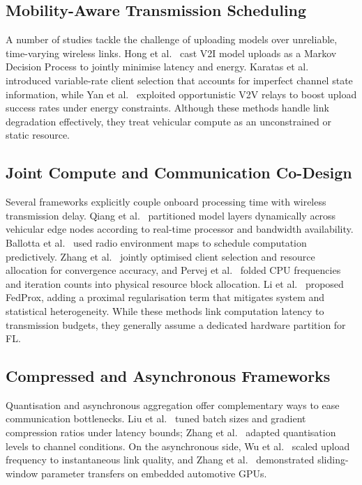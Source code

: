 \documentclass[conference]{IEEEtran}
\begin{document}
\subsection{Mobility-Aware Transmission Scheduling}
A number of studies tackle the challenge of uploading models over unreliable, time-varying wireless links. Hong et al.~\cite{ref_hong} cast V2I model uploads as a Markov Decision Process to jointly minimise latency and energy. Karatas et al.~\cite{ref_karatas} introduced variable-rate client selection that accounts for imperfect channel state information, while Yan et al.~\cite{ref_yan} exploited opportunistic V2V relays to boost upload success rates under energy constraints. Although these methods handle link degradation effectively, they treat vehicular compute as an unconstrained or static resource.

\subsection{Joint Compute and Communication Co-Design}
Several frameworks explicitly couple onboard processing time with wireless transmission delay. Qiang et al.~\cite{ref_qiang} partitioned model layers dynamically across vehicular edge nodes according to real-time processor and bandwidth availability. Ballotta et al.~\cite{ref_ballotta} used radio environment maps to schedule computation predictively. Zhang et al.~\cite{ref_zhang_selection} jointly optimised client selection and resource allocation for convergence accuracy, and Pervej et al.~\cite{ref_pervej} folded CPU frequencies and iteration counts into physical resource block allocation. Li et al.~\cite{ref_fedprox} proposed FedProx, adding a proximal regularisation term that mitigates system and statistical heterogeneity. While these methods link computation latency to transmission budgets, they generally assume a dedicated hardware partition for FL.

\subsection{Compressed and Asynchronous Frameworks}
Quantisation and asynchronous aggregation offer complementary ways to ease communication bottlenecks. Liu et al.~\cite{ref_liu} tuned batch sizes and gradient compression ratios under latency bounds; Zhang et al.~\cite{ref_zhang_quant} adapted quantisation levels to channel conditions. On the asynchronous side, Wu et al.~\cite{ref_wu} scaled upload frequency to instantaneous link quality, and Zhang et al.~\cite{ref_zhang_automotive} demonstrated sliding-window parameter transfers on embedded automotive GPUs.
\end{document}
